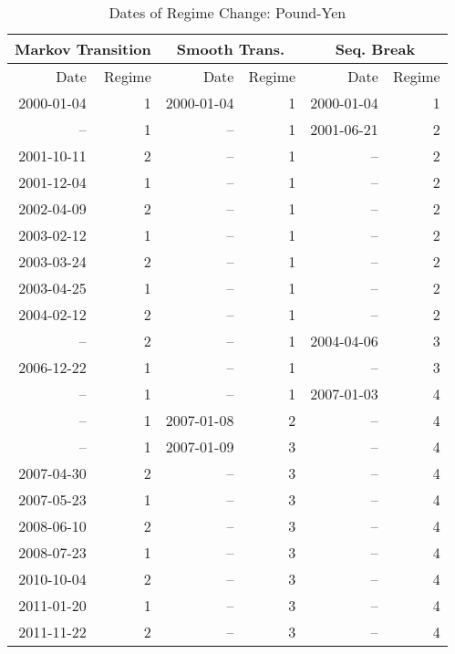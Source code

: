 \begin{table}
	\centering
	\begin{threeparttable}
		\caption{Dates of Regime Change: Pound-Yen}	\label{tbl:regime_changes_pound_yen}
		\begin{tabular}[c]{r r | r r | r r}
			\midrule
			\multicolumn{2}{c}{Markov Transition} & \multicolumn{2}{c}{Smooth Trans.} & \multicolumn{2}{c}{Seq. Break} \\
			\midrule
			Date & Regime & Date & Regime & Date & Regime \\
			\midrule
			2000-01-04 &  1 & 2000-01-04 &  1 & 2000-01-04 &  1 \\
					-- &  1 &         -- &  1 & 2001-06-21 &  2 \\
			2001-10-11 &  2 &         -- &  1 &         -- &  2 \\
			2001-12-04 &  1 &         -- &  1 &         -- &  2 \\
			2002-04-09 &  2 &         -- &  1 &         -- &  2 \\
			2003-02-12 &  1 &         -- &  1 &         -- &  2 \\
			2003-03-24 &  2 &         -- &  1 &         -- &  2 \\
			2003-04-25 &  1 &         -- &  1 &         -- &  2 \\
			2004-02-12 &  2 &         -- &  1 &         -- &  2 \\
					-- &  2 &         -- &  1 & 2004-04-06 &  3 \\
			2006-12-22 &  1 &         -- &  1 &         -- &  3 \\
					-- &  1 &         -- &  1 & 2007-01-03 &  4 \\
					-- &  1 & 2007-01-08 &  2 &         -- &  4 \\
					-- &  1 & 2007-01-09 &  3 &         -- &  4 \\
			2007-04-30 &  2 &         -- &  3 &         -- &  4 \\
			2007-05-23 &  1 &         -- &  3 &         -- &  4 \\
			2008-06-10 &  2 &         -- &  3 &         -- &  4 \\
			2008-07-23 &  1 &         -- &  3 &         -- &  4 \\
			2010-10-04 &  2 &         -- &  3 &         -- &  4 \\
			2011-01-20 &  1 &         -- &  3 &         -- &  4 \\
			2011-11-22 &  2 &         -- &  3 &         -- &  4 \\

\end{tabular}
\end{threeparttable}
\end{table}
